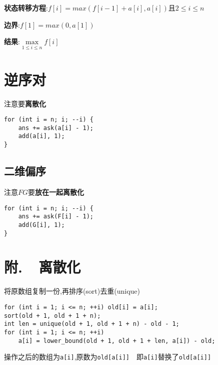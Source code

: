 \documentclass[UTF8]{ctexart}
\begin{document}
\textbf{状态转移方程}:$f[i] = max(f[i - 1] + a[i], a[i])$且$2\leq i\leq n$

\textbf{边界}:$f[1] = max(0, a[1])$

\textbf{结果}:$\max\limits_{1\leq i\leq n}f[i]$


\section{逆序对}

注意要\textbf{离散化}

\begin{lstlisting}
for (int i = n; i; --i) {
	ans += ask(a[i] - 1);
	add(a[i], 1);
}
\end{lstlisting}

\subsection{二维偏序}

注意$FG$要\textbf{放在一起离散化}

\begin{lstlisting}
for (int i = n; i; --i) {
	ans += ask(F[i] - 1);
	add(G[i], 1);
}
\end{lstlisting}

\section*{附.\ \  离散化}

将原数组复制一份,再排序(sort)去重(unique)

\begin{lstlisting}
for (int i = 1; i <= n; ++i) old[i] = a[i];
sort(old + 1, old + 1 + n);
int len = unique(old + 1, old + 1 + n) - old - 1;
for (int i = 1; i <= n; ++i) 
	a[i] = lower_bound(old + 1, old + 1 + len, a[i]) - old;
\end{lstlisting}

操作之后的数组为\texttt{a[i]},原数为\texttt{old[a[i]]}\ \ 即\texttt{a[i]}替换了\texttt{old[a[i]]}
\end{document}
